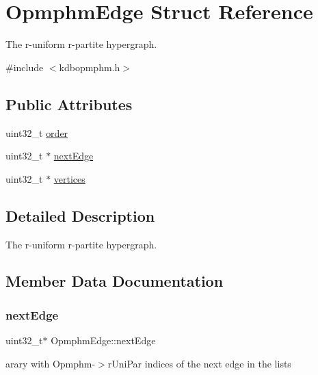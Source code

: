 \hypertarget{structOpmphmEdge}{}\section{Opmphm\+Edge Struct Reference}
\label{structOpmphmEdge}


The r-\/uniform r-\/partite hypergraph.  




{\ttfamily \#include $<$kdbopmphm.\+h$>$}

\subsection*{Public Attributes}
\begin{DoxyCompactItemize}
\item 
uint32\+\_\+t \hyperlink{structOpmphmEdge_a0d125d2d8a97f191896b816123c09d14}{order}
\item 
uint32\+\_\+t $\ast$ \hyperlink{structOpmphmEdge_a4a0e9a3d422a25a57f52530f003c3a5e}{next\+Edge}
\item 
uint32\+\_\+t $\ast$ \hyperlink{structOpmphmEdge_ae8d5721fe78750b17b5d4a9b8e3fc2b2}{vertices}
\end{DoxyCompactItemize}


\subsection{Detailed Description}
The r-\/uniform r-\/partite hypergraph. 

\subsection{Member Data Documentation}
\mbox{\label{structOpmphmEdge_a4a0e9a3d422a25a57f52530f003c3a5e}} 
\subsubsection{\texorpdfstring{next\+Edge}{nextEdge}}
{\footnotesize\ttfamily uint32\+\_\+t$\ast$ Opmphm\+Edge\+::next\+Edge}

arary with Opmphm-\/$>$r\+Uni\+Par indices of the next edge in the lists \mbox{\label{structOpmphmEdge_a0d125d2d8a97f191896b816123c09d14}} 
